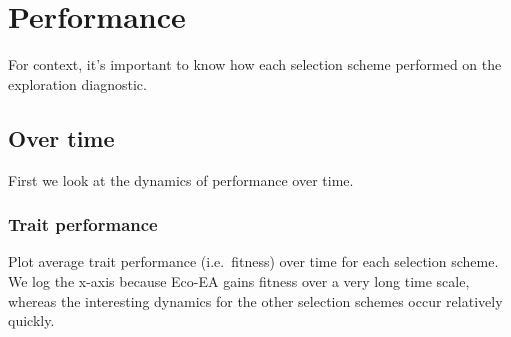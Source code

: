 \documentclass[]{book}
\begin{document}
\hypertarget{performance}{%
\section{Performance}\label{performance}}

For context, it's important to know how each selection scheme performed on the exploration diagnostic.

\hypertarget{over-time}{%
\subsection{Over time}\label{over-time}}

First we look at the dynamics of performance over time.

\hypertarget{trait-performance}{%
\subsubsection{Trait performance}\label{trait-performance}}

Plot average trait performance (i.e.~fitness) over time for each selection scheme. We log the x-axis because Eco-EA gains fitness over a very long time scale, whereas the interesting dynamics for the other selection schemes occur relatively quickly.
\end{document}
